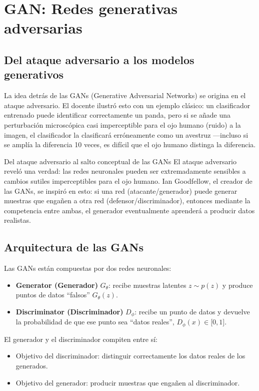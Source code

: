 \section{GAN: Redes generativas adversarias}

\subsection{Del ataque adversario a los modelos generativos}

La idea detrás de las GANs (Generative Adversarial Networks) se origina en el ataque adversario. El docente ilustró esto con un ejemplo clásico: un clasificador entrenado puede identificar correctamente un panda, pero si se añade una perturbación microscópica casi imperceptible para el ojo humano (ruido) a la imagen, el clasificador la clasificará erróneamente como un avestruz —incluso si se amplía la diferencia 10 veces, es difícil que el ojo humano distinga la diferencia.

\begin{knowledgebox}{Del ataque adversario al salto conceptual de las GANs}
El ataque adversario reveló una verdad: las redes neuronales pueden ser extremadamente sensibles a cambios sutiles imperceptibles para el ojo humano. Ian Goodfellow, el creador de las GANs, se inspiró en esto: si una red (atacante/generador) puede generar muestras que engañen a otra red (defensor/discriminador), entonces mediante la competencia entre ambas, el generador eventualmente aprenderá a producir datos realistas.
\end{knowledgebox}

\subsection{Arquitectura de las GANs}

Las GANs están compuestas por dos redes neuronales:

\begin{itemize}
    \item \textbf{Generator (Generador)} $G_\theta$: recibe muestras latentes $z \sim p(z)$ y produce puntos de datos ``falsos'' $G_\theta(z)$.
    \item \textbf{Discriminator (Discriminador)} $D_\phi$: recibe un punto de datos y devuelve la probabilidad de que ese punto sea ``datos reales'', $D_\phi(x) \in {[}0, 1{]}$.
\end{itemize}

El generador y el discriminador compiten entre sí:
\begin{itemize}
    \item Objetivo del discriminador: distinguir correctamente los datos reales de los generados.
    \item Objetivo del generador: producir muestras que engañen al discriminador.
\end{itemize}


